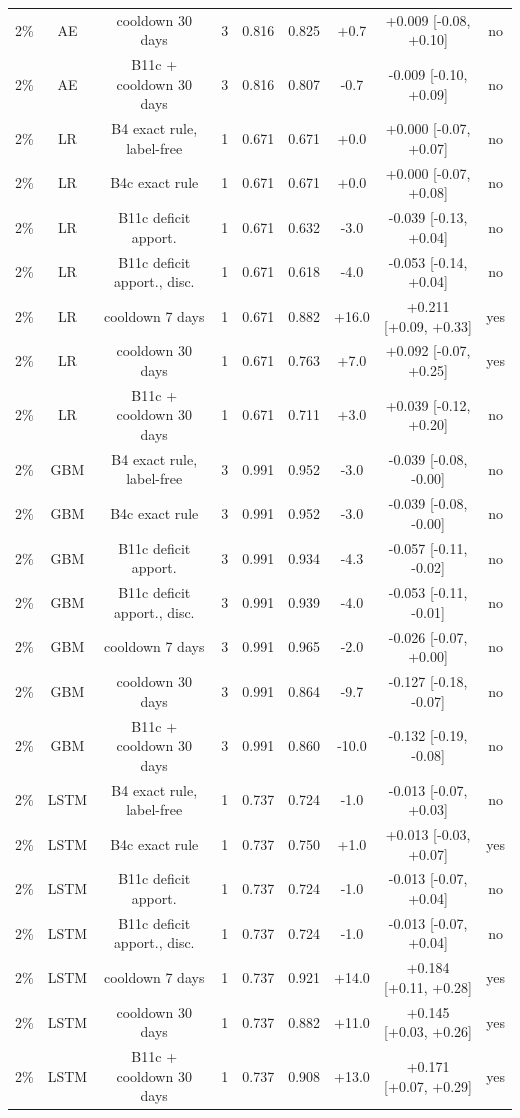 \documentclass[10pt,onecolumn,letterpaper]{article}
\begin{document}
\begin{table}[!t]
{\begin{tabular}{lcccccccc}
2\% & AE & cooldown 30 days & 3 & 0.816 & 0.825 & +0.7 & +0.009 [-0.08, +0.10] & no \\
2\% & AE & B11c + cooldown 30 days & 3 & 0.816 & 0.807 & -0.7 & -0.009 [-0.10, +0.09] & no \\
2\% & LR & B4 exact rule, label-free & 1 & 0.671 & 0.671 & +0.0 & +0.000 [-0.07, +0.07] & no \\
2\% & LR & B4c exact rule & 1 & 0.671 & 0.671 & +0.0 & +0.000 [-0.07, +0.08] & no \\
2\% & LR & B11c deficit apport. & 1 & 0.671 & 0.632 & -3.0 & -0.039 [-0.13, +0.04] & no \\
2\% & LR & B11c deficit apport., disc. & 1 & 0.671 & 0.618 & -4.0 & -0.053 [-0.14, +0.04] & no \\
2\% & LR & cooldown 7 days & 1 & 0.671 & 0.882 & +16.0 & +0.211 [+0.09, +0.33] & yes \\
2\% & LR & cooldown 30 days & 1 & 0.671 & 0.763 & +7.0 & +0.092 [-0.07, +0.25] & yes \\
2\% & LR & B11c + cooldown 30 days & 1 & 0.671 & 0.711 & +3.0 & +0.039 [-0.12, +0.20] & no \\
2\% & GBM & B4 exact rule, label-free & 3 & 0.991 & 0.952 & -3.0 & -0.039 [-0.08, -0.00] & no \\
2\% & GBM & B4c exact rule & 3 & 0.991 & 0.952 & -3.0 & -0.039 [-0.08, -0.00] & no \\
2\% & GBM & B11c deficit apport. & 3 & 0.991 & 0.934 & -4.3 & -0.057 [-0.11, -0.02] & no \\
2\% & GBM & B11c deficit apport., disc. & 3 & 0.991 & 0.939 & -4.0 & -0.053 [-0.11, -0.01] & no \\
2\% & GBM & cooldown 7 days & 3 & 0.991 & 0.965 & -2.0 & -0.026 [-0.07, +0.00] & no \\
2\% & GBM & cooldown 30 days & 3 & 0.991 & 0.864 & -9.7 & -0.127 [-0.18, -0.07] & no \\
2\% & GBM & B11c + cooldown 30 days & 3 & 0.991 & 0.860 & -10.0 & -0.132 [-0.19, -0.08] & no \\
2\% & LSTM & B4 exact rule, label-free & 1 & 0.737 & 0.724 & -1.0 & -0.013 [-0.07, +0.03] & no \\
2\% & LSTM & B4c exact rule & 1 & 0.737 & 0.750 & +1.0 & +0.013 [-0.03, +0.07] & yes \\
2\% & LSTM & B11c deficit apport. & 1 & 0.737 & 0.724 & -1.0 & -0.013 [-0.07, +0.04] & no \\
2\% & LSTM & B11c deficit apport., disc. & 1 & 0.737 & 0.724 & -1.0 & -0.013 [-0.07, +0.04] & no \\
2\% & LSTM & cooldown 7 days & 1 & 0.737 & 0.921 & +14.0 & +0.184 [+0.11, +0.28] & yes \\
2\% & LSTM & cooldown 30 days & 1 & 0.737 & 0.882 & +11.0 & +0.145 [+0.03, +0.26] & yes \\
2\% & LSTM & B11c + cooldown 30 days & 1 & 0.737 & 0.908 & +13.0 & +0.171 [+0.07, +0.29] & yes \\
\bottomrule
\end{tabular}}
\end{table}
\end{document}
